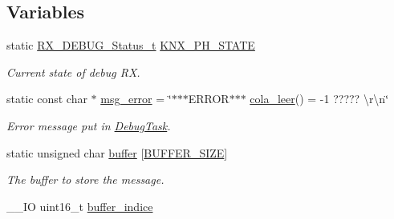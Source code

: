 \subsection*{Variables}
\begin{DoxyCompactItemize}
\item 
static \hyperlink{group___debug___exported___types_gabcec3ea567663bbefa0b9f7a88dd68f2}{R\+X\+\_\+\+D\+E\+B\+U\+G\+\_\+\+Status\+\_\+t} \hyperlink{group___debug___private___variables_ga65a0aa461c7b3901566170f888d0004c}{K\+N\+X\+\_\+\+P\+H\+\_\+\+S\+T\+A\+TE}\hypertarget{group___debug___private___variables_ga65a0aa461c7b3901566170f888d0004c}{}\label{group___debug___private___variables_ga65a0aa461c7b3901566170f888d0004c}

\begin{DoxyCompactList}\small\item\em Current state of debug RX. \end{DoxyCompactList}\item 
static const char $\ast$ \hyperlink{group___debug___private___variables_ga57ad017acd4535fe089f54ed903b3e9e}{msg\+\_\+error} = \char`\"{}$\ast$$\ast$$\ast$E\+R\+R\+OR$\ast$$\ast$$\ast$ \hyperlink{group___cola___exported___functions___group2_ga12fe948f259d8c9d7a390a76c416b55c}{cola\+\_\+leer}() = -\/1 ????? \textbackslash{}r\textbackslash{}n\char`\"{}\hypertarget{group___debug___private___variables_ga57ad017acd4535fe089f54ed903b3e9e}{}\label{group___debug___private___variables_ga57ad017acd4535fe089f54ed903b3e9e}

\begin{DoxyCompactList}\small\item\em Error message put in \hyperlink{group___debug___exported___functions___group2_ga0e7fca846e34e06a1f62249fe8a30a44}{Debug\+Task}. \end{DoxyCompactList}\item 
static unsigned char \hyperlink{group___debug___private___variables_gacab2203504e72e5e674d3174e0bd7d5e}{buffer} \mbox{[}\hyperlink{group___debug___private___define_ga6b20d41d6252e9871430c242cb1a56e7}{B\+U\+F\+F\+E\+R\+\_\+\+S\+I\+ZE}\mbox{]}\hypertarget{group___debug___private___variables_gacab2203504e72e5e674d3174e0bd7d5e}{}\label{group___debug___private___variables_gacab2203504e72e5e674d3174e0bd7d5e}

\begin{DoxyCompactList}\small\item\em The buffer to store the message. \end{DoxyCompactList}\item 
\+\_\+\+\_\+\+IO uint16\+\_\+t \hyperlink{group___debug___private___variables_gacd3f15a092421e9fa47f50d4f95f212b}{buffer\+\_\+indice}\hypertarget{group___debug___private___variables_gacd3f15a092421e9fa47f50d4f95f212b}{}\label{group___debug___private___variables_gacd3f15a092421e9fa47f50d4f95f212b}


\end{DoxyCompactItemize}
